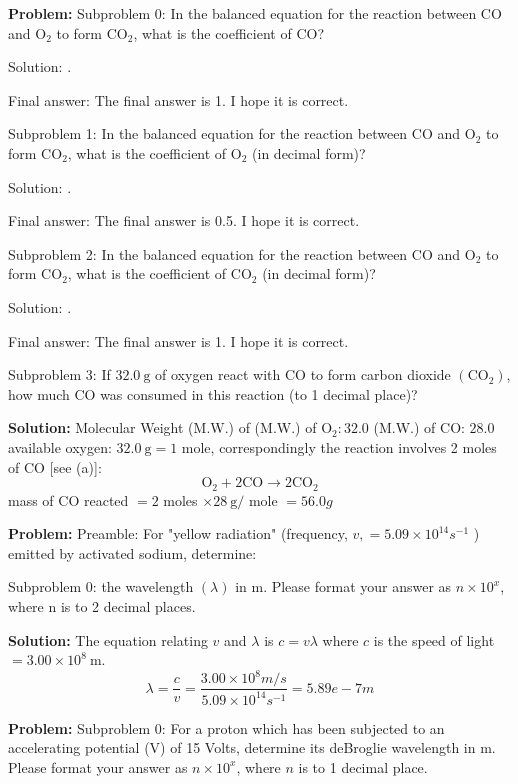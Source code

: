 \documentclass[10pt]{article}
\begin{document}
\textbf{Problem:}
Subproblem 0: In the balanced equation for the reaction between $\mathrm{CO}$ and $\mathrm{O}_{2}$ to form $\mathrm{CO}_{2}$, what is the coefficient of $\mathrm{CO}$?


Solution: .

Final answer: The final answer is 1. I hope it is correct.

Subproblem 1: In the balanced equation for the reaction between $\mathrm{CO}$ and $\mathrm{O}_{2}$ to form $\mathrm{CO}_{2}$, what is the coefficient of $\mathrm{O}_{2}$ (in decimal form)?


Solution: . 

Final answer: The final answer is 0.5. I hope it is correct.

Subproblem 2: In the balanced equation for the reaction between $\mathrm{CO}$ and $\mathrm{O}_{2}$ to form $\mathrm{CO}_{2}$, what is the coefficient of $\mathrm{CO}_{2}$ (in decimal form)?


Solution: .

Final answer: The final answer is 1. I hope it is correct.

Subproblem 3: If $32.0 \mathrm{~g}$ of oxygen react with $\mathrm{CO}$ to form carbon dioxide $\left(\mathrm{CO}_{2}\right)$, how much CO was consumed in this reaction (to 1 decimal place)?


\textbf{Solution:}
Molecular Weight (M.W.) of (M.W.) of $\mathrm{O}_{2}: 32.0$
(M.W.) of CO: $28.0$
available oxygen: $32.0 \mathrm{~g}=1$ mole, correspondingly the reaction involves 2 moles of CO [see (a)]:
\[
\mathrm{O}_{2}+2 \mathrm{CO} \rightarrow 2 \mathrm{CO}_{2}
\]
mass of CO reacted $=2$ moles $\times 28 \mathrm{~g} /$ mole $=\boxed{56.0} g$


\textbf{Problem:}
Preamble: For "yellow radiation" (frequency, $v,=5.09 \times 10^{14} s^{-1}$ ) emitted by activated sodium, determine:

Subproblem 0: the wavelength $(\lambda)$ in m. Please format your answer as $n \times 10^x$, where n is to 2 decimal places.


\textbf{Solution:}
The equation relating $v$ and $\lambda$ is $c=v \lambda$ where $c$ is the speed of light $=3.00 \times 10^{8} \mathrm{~m}$.
\[
\lambda=\frac{c}{v}=\frac{3.00 \times 10^{8} m / s}{5.09 \times 10^{14} s^{-1}}=\boxed{5.89e-7} m
\]


\textbf{Problem:}
Subproblem 0: For a proton which has been subjected to an accelerating potential (V) of 15 Volts, determine its deBroglie wavelength in m. Please format your answer as $n \times 10^x$, where $n$ is to 1 decimal place. 
\end{document}

